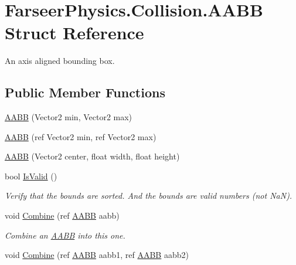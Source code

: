 \hypertarget{struct_farseer_physics_1_1_collision_1_1_a_a_b_b}{\section{Farseer\+Physics.\+Collision.\+A\+A\+B\+B Struct Reference}
\label{struct_farseer_physics_1_1_collision_1_1_a_a_b_b}
}


An axis aligned bounding box.  


\subsection*{Public Member Functions}
\begin{DoxyCompactItemize}
\item 
\hyperlink{struct_farseer_physics_1_1_collision_1_1_a_a_b_b_aa4c7be6cfcfc78e8c194354917d679e2}{A\+A\+B\+B} (Vector2 min, Vector2 max)
\item 
\hyperlink{struct_farseer_physics_1_1_collision_1_1_a_a_b_b_a1a358a16dfb6ab89b360b4689634ab3e}{A\+A\+B\+B} (ref Vector2 min, ref Vector2 max)
\item 
\hyperlink{struct_farseer_physics_1_1_collision_1_1_a_a_b_b_a7e3b8eee9e66d14145cc40268f73f9f0}{A\+A\+B\+B} (Vector2 center, float width, float height)
\item 
bool \hyperlink{struct_farseer_physics_1_1_collision_1_1_a_a_b_b_a5debe9d033d01b4fd482b9cc5da126d6}{Is\+Valid} ()
\begin{DoxyCompactList}\small\item\em Verify that the bounds are sorted. And the bounds are valid numbers (not Na\+N). \end{DoxyCompactList}\item 
void \hyperlink{struct_farseer_physics_1_1_collision_1_1_a_a_b_b_aed920cb5b92a781b51655c36deda0596}{Combine} (ref \hyperlink{struct_farseer_physics_1_1_collision_1_1_a_a_b_b}{A\+A\+B\+B} aabb)
\begin{DoxyCompactList}\small\item\em Combine an \hyperlink{struct_farseer_physics_1_1_collision_1_1_a_a_b_b}{A\+A\+B\+B} into this one. \end{DoxyCompactList}\item 
void \hyperlink{struct_farseer_physics_1_1_collision_1_1_a_a_b_b_ae67e2c2f39a405de8640664da88c53cc}{Combine} (ref \hyperlink{struct_farseer_physics_1_1_collision_1_1_a_a_b_b}{A\+A\+B\+B} aabb1, ref \hyperlink{struct_farseer_physics_1_1_collision_1_1_a_a_b_b}{A\+A\+B\+B} aabb2)

\end{DoxyCompactItemize}
